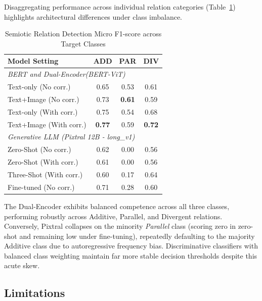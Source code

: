 Disaggregating performance across individual relation categories (Table~\ref{tab:subset_relation}) highlights architectural differences under class imbalance.

\begin{table}[!t]
\centering
\caption{Semiotic Relation Detection Micro F1-score across Target Classes}
\label{tab:subset_relation}
\footnotesize
\renewcommand{\arraystretch}{0.90}
\begin{tabular}{l c c c}
\hline
\textbf{Model Setting} & \textbf{ADD} & \textbf{PAR} & \textbf{DIV} \\
\hline
\multicolumn{4}{l}{\textit{BERT and Dual-Encoder(BERT-ViT)}} \\
Text-only (No corr.) & 0.65 & 0.53 & 0.61 \\
Text+Image (No corr.) & 0.73 & \textbf{0.61} & 0.59 \\
Text-only (With corr.) & 0.75 & 0.54 & 0.68 \\
Text+Image (With corr.) & \textbf{0.77} & 0.59 & \textbf{0.72} \\
\hline
\multicolumn{4}{l}{\textit{Generative LLM (Pixtral 12B - long\_v1)}} \\
Zero-Shot (No corr.) & 0.62 & 0.00 & 0.56 \\
Zero-Shot (With corr.) & 0.61 & 0.00 & 0.56 \\
Three-Shot (With corr.) & 0.60 & 0.17 & 0.64 \\
Fine-tuned (No corr.) & 0.71 & 0.28 & 0.60 \\
\hline
\end{tabular}
\end{table}

The Dual-Encoder exhibits balanced competence across all three classes, performing robustly across Additive, Parallel, and Divergent relations. Conversely, Pixtral collapses on the minority \textit{Parallel} class (scoring zero in zero-shot and remaining low under fine-tuning), repeatedly defaulting to the majority Additive class due to autoregressive frequency bias. Discriminative classifiers with balanced class weighting maintain far more stable decision thresholds despite this acute skew.

\subsection{Limitations}
\label{sec:limitations}

